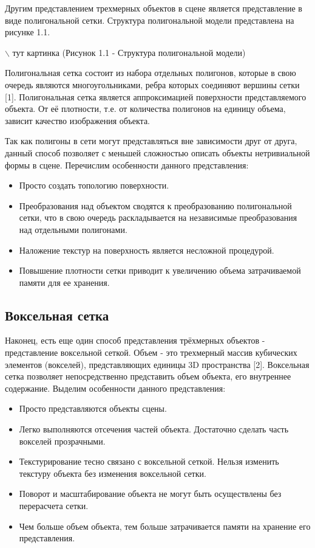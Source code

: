 Другим представлением трехмерных объектов в сцене является представление в виде полигональной сетки. Структура полигональной модели представлена на рисунке 1.1.

$\backslash$ тут картинка (Рисунок 1.1 - Структура полигональной модели)

Полигональная сетка состоит из набора отдельных полигонов, которые в свою очередь являются многоугольниками, ребра которых соединяют вершины сетки [1]. Полигональная сетка является аппроксимацией поверхности представляемого объекта. От её плотности, т.е. от количества полигонов на единицу объема, зависит качество изображения объекта.

Так как полигоны в сети могут представляться вне зависимости друг от друга, данный способ позволяет с меньшей сложностью описать объекты нетривиальной формы в сцене. Перечислим особенности данного представления:

\begin{itemize}[$\bullet$]
	\item Просто создать топологию поверхности.
	\item Преобразования над объектом сводятся к преобразованию полигональной сетки, что в свою очередь раскладывается на независимые преобразования над отдельными полигонами.
	\item Наложение текстур на поверхность является несложной процедурой.
	\item Повышение плотности сетки приводит к увеличению объема затрачиваемой памяти для ее хранения.
\end{itemize}

\subsection{Воксельная сетка}

Наконец, есть еще один способ представления трёхмерных объектов - представление воксельной сеткой. Объем - это трехмерный массив кубических элементов (вокселей), представляющих единицы 3D пространства [2]. Воксельная сетка позволяет непосредственно представить объем объекта, его внутреннее содержание. Выделим особенности данного представления:

\begin{itemize}
	\item Просто представляются объекты сцены.
	\item Легко выполняются отсечения частей объекта. Достаточно сделать часть вокселей прозрачными.
	\item Текстурирование тесно связано с воксельной сеткой. Нельзя изменить текстуру объекта без изменения воксельной сетки.
	\item Поворот и масштабирование объекта не могут быть осуществлены без перерасчета сетки.
	\item Чем больше объем объекта, тем больше затрачивается памяти на хранение его представления.
\end{itemize}

